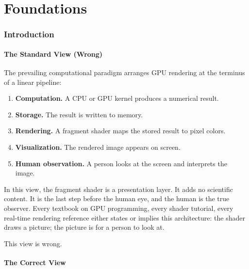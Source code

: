 \documentclass[11pt,twocolumn,a4paper]{article}
\theoremstyle{definition}
\theoremstyle{remark}
\begin{document}

\part{Foundations}

\section{Introduction}
\label{sec:introduction}

\subsection{The Standard View (Wrong)}
\label{sec:standard_view}

The prevailing computational paradigm arranges GPU rendering at the terminus of a linear pipeline:
\begin{enumerate}[nosep]
\item \textbf{Computation.} A CPU or GPU kernel produces a numerical result.
\item \textbf{Storage.} The result is written to memory.
\item \textbf{Rendering.} A fragment shader maps the stored result to pixel colors.
\item \textbf{Visualization.} The rendered image appears on screen.
\item \textbf{Human observation.} A person looks at the screen and interprets the image.
\end{enumerate}
In this view, the fragment shader is a presentation layer. It adds no scientific content. It is the last step before the human eye, and the human is the true observer. Every textbook on GPU programming, every shader tutorial, every real-time rendering reference \citep{akenine2018, owens2007, harris2005} either states or implies this architecture: the shader draws a picture; the picture is for a person to look at.

This view is wrong.

\subsection{The Correct View}
\label{sec:correct_view}
\end{document}

